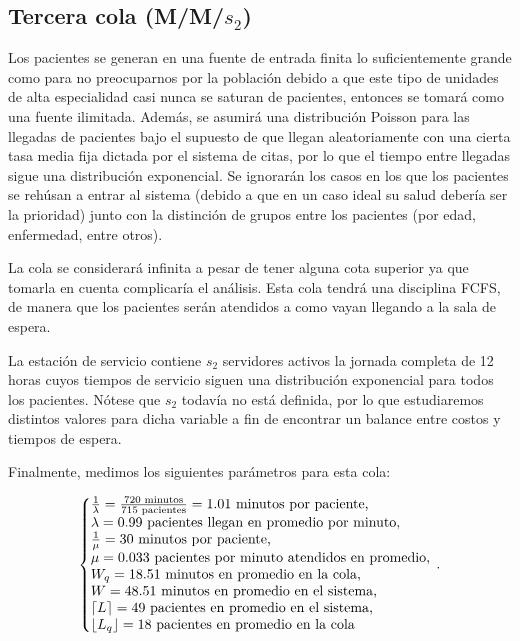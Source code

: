 \documentclass[10pt]{article}
\begin{document}
    \subsection{Tercera cola (M/M/$s_{2}$)}
    Los pacientes se generan en una fuente de entrada finita lo suficientemente grande como para no preocuparnos por la población debido a que este tipo de unidades de alta especialidad casi nunca se saturan de pacientes, entonces se tomará como una fuente ilimitada. Además, se asumirá una distribución Poisson para las llegadas de pacientes bajo el supuesto de que llegan aleatoriamente con una cierta tasa media fija dictada por el sistema de citas, por lo que el tiempo entre llegadas sigue una distribución exponencial. Se ignorarán los casos en los que los pacientes se rehúsan a entrar al sistema (debido a que en un caso ideal su salud debería ser la prioridad) junto con la distinción de grupos entre los pacientes (por edad, enfermedad, entre otros).
    
    La cola se considerará infinita a pesar de tener alguna cota superior ya que tomarla en cuenta complicaría el análisis. Esta cola tendrá una disciplina FCFS, de manera que los pacientes serán atendidos a como vayan llegando a la sala de espera.
    
    La estación de servicio contiene $s_{2}$ servidores activos la jornada completa de 12 horas cuyos tiempos de servicio siguen una distribución exponencial para todos los pacientes. Nótese que $s_{2}$ todavía no está definida, por lo que estudiaremos distintos valores para dicha variable a fin de encontrar un balance entre costos y tiempos de espera.
    
    Finalmente, medimos los siguientes parámetros para esta cola: 
    
    \begin{equation*}
    	\left\{
    	\begin{array}{@{}l@{}}
    		\frac{1}{\lambda} = \frac{720 \text{ minutos}}{715 \text{ pacientes}} = 1.01 \text{ minutos por paciente,} \\
    		\lambda = 0.99 \text{ pacientes llegan en promedio por minuto,} \\
    		\frac{1}{\mu} = 30 \text{ minutos por paciente,} \\
    		\mu = 0.033 \text{ pacientes por minuto atendidos en promedio,} \\
    		W_{q} = 18.51 \text{ minutos en promedio en la cola,} \\
    		W = 48.51 \text{ minutos en promedio en el sistema,} \\
    		\left\lceil L \right\rceil = 49 \text{ pacientes en promedio en el sistema,} \\
    		\left\lfloor L_{q} \right\rfloor = 18 \text{ pacientes en promedio en la cola}
    	\end{array}
    	\right.\,.
    \end{equation*}
    
\end{document}
